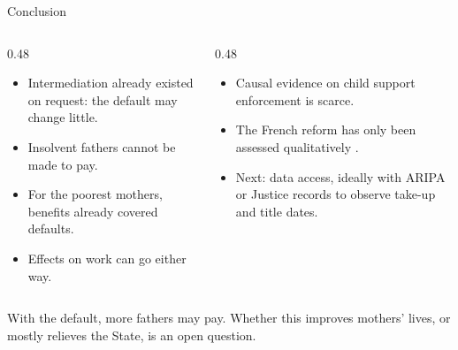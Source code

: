 \documentclass[aspectratio=169,10pt]{beamer}
\begin{document}
\begin{frame}{Conclusion}
\vspace{-0.1cm}
\footnotesize
\begin{columns}[T,onlytextwidth]
  \begin{column}{0.48\textwidth}
    \begin{keybox}
      \begin{itemize}
        \setlength{\itemsep}{0.08cm}
        \item Intermediation already existed on request: the default may change little.
        \item Insolvent fathers cannot be made to pay.
        \item For the poorest mothers, benefits already covered defaults.
        \item Effects on work can go either way.
      \end{itemize}
    \end{keybox}
  \end{column}
  \begin{column}{0.48\textwidth}
    \begin{keybox}
      \begin{itemize}
        \setlength{\itemsep}{0.08cm}
        \item Causal evidence on child support enforcement is scarce.
        \item The French reform has only been assessed qualitatively \parencite{titlied2024}.
        \item Next: data access, ideally with ARIPA or Justice records to observe take-up and title dates.
      \end{itemize}
    \end{keybox}
  \end{column}
\end{columns}

\vspace{0.3cm}
\begin{keybox}
  \centering
  With the default, more fathers may pay. Whether this improves mothers' lives, or mostly relieves the State,
  is an open question.
\end{keybox}
\end{frame}


\end{document}
